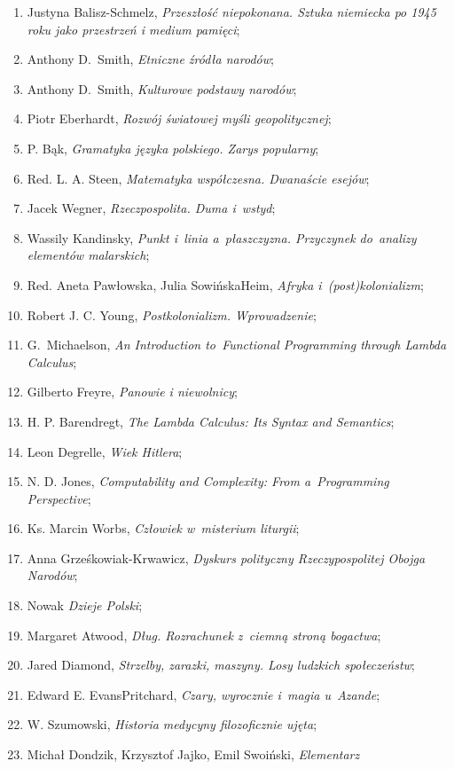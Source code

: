 \documentclass[a4paper,11pt]{article}
\begin{document}
\begin{enumerate}
{    codzienne};
\item Justyna Balisz-Schmelz, \emph{Przeszłość niepokonana. Sztuka
    niemiecka po 1945 roku jako przestrzeń i medium pamięci};
\item Anthony D.~Smith, \emph{Etniczne źródła narodów};
\item Anthony D.~Smith, \emph{Kulturowe podstawy narodów};
\item Piotr Eberhardt, \emph{Rozwój światowej myśli geopolitycznej};
\item P. Bąk, \emph{Gramatyka języka polskiego. Zarys popularny};
\item Red. L. A. Steen, \emph{Matematyka współczesna. Dwanaście
    esejów};
\item Jacek Wegner, \emph{Rzeczpospolita. Duma i~wstyd};
\item Wassily Kandinsky, \emph{Punkt i~linia a~płaszczyzna. Przyczynek
    do~analizy elementów malarskich};
\item Red. Aneta Pawłowska, Julia Sowińska\dywiz Heim, \emph{Afryka
    i~(post)kolonializm};
\item Robert J. C. Young, \emph{Postkolonializm. Wprowadzenie};
\item G.~Michaelson, \emph{An Introduction to~Functional Programming
    through Lambda Calculus};
\item Gilberto Freyre, \emph{Panowie i niewolnicy};
\item H. P. Barendregt, \emph{The Lambda Calculus: Its Syntax and
    Semantics};
\item Leon Degrelle, \emph{Wiek Hitlera};
\item N. D. Jones, \emph{Computability and Complexity: From
    a~Programming Perspective};
\item Ks. Marcin Worbs, \emph{Człowiek w~misterium liturgii};
\item Anna Grześkowiak-Krwawicz, \emph{Dyskurs polityczny
    Rzeczypospolitej Obojga Narodów};
\item Nowak \emph{Dzieje Polski};
\item Margaret Atwood, \emph{Dług. Rozrachunek z~ciemną stroną
    bogactwa};
\item Jared Diamond, \emph{Strzelby, zarazki, maszyny. Losy ludzkich
    społeczeństw};
\item Edward E. Evans\dywiz Pritchard, \emph{Czary, wyrocznie i~magia
    u~Azande};
\item W. Szumowski, \emph{Historia medycyny filozoficznie ujęta};
\item Michał Dondzik, Krzysztof Jajko, Emil Swoiński, \emph{Elementarz
}
\end{enumerate}
\end{document}
